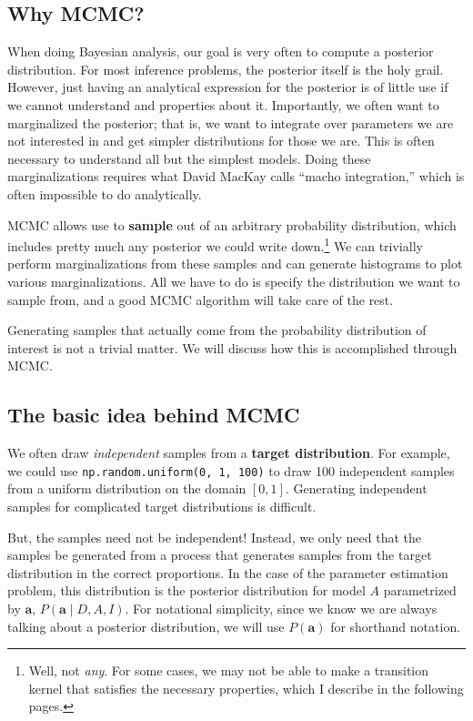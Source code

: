 

\subsection{Why MCMC?}
When doing Bayesian analysis, our goal is very often to compute a
posterior distribution.  For most inference problems, the posterior
itself is the holy grail.  However, just having an analytical
expression for the posterior is of little use if we cannot understand
and properties about it.  Importantly, we often want to marginalized
the posterior; that is, we want to integrate over parameters we are
not interested in and get simpler distributions for those we are.
This is often necessary to understand all but the simplest models.
Doing these marginalizations requires what David MacKay calls ``macho
integration,'' which is often impossible to do analytically.

MCMC allows use to \textbf{sample} out of an arbitrary probability
distribution, which includes pretty much any posterior we could write
down.\footnote{Well, not \textit{any}.  For some cases, we may not be
  able to make a transition kernel that satisfies the necessary
  properties, which I describe in the following pages.}  We can
trivially perform marginalizations from these samples and can generate
histograms to plot various marginalizations.  All we have to do is
specify the distribution we want to sample from, and a good MCMC
algorithm will take care of the rest.

Generating samples that actually come from the probability
distribution of interest is not a trivial matter.  We will discuss how
this is accomplished through MCMC.


\subsection{The basic idea behind MCMC}
We often draw \textit{independent} samples from a \textbf{target
  distribution}.  For example, we could use
\verb|np.random.uniform(0, 1, 100)| to draw 100 independent samples
from a uniform distribution on the domain $[0,1]$.  Generating
independent samples for complicated target distributions is difficult.

But, the samples need not be independent!  Instead, we only need that
the samples be generated from a process that generates samples from
the target distribution in the correct proportions.  In the case of
the parameter estimation problem, this distribution is the posterior
distribution for model $A$ parametrized by $\mathbf{a}$,
$P(\mathbf{a}\mid D, A, I)$.  For notational simplicity, since we know
we are always talking about a posterior distribution, we will use
$P(\mathbf{a})$ for shorthand notation.

